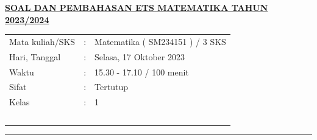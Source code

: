 \documentclass[10pt,openany,a4paper]{article}
\theoremstyle{definition}
\theoremstyle{definition}
\theoremstyle{plain}
\begin{document}
\newpage
 \begin{center}
	{\underline{\textbf{\MakeUppercase{Soal dan Pembahasan ETS Matematika Tahun 2023/2024}}}}
    \end{center}

    \begin{center}
	\begin{tabular}{lcl}
		Mata kuliah/SKS & : & Matematika ( SM234151 ) / 3 SKS\\
		Hari, Tanggal & : & Selasa, 17 Oktober 2023\\
		Waktu & : & 15.30 - 17.10 / 100 menit\\
		Sifat & : & Tertutup\\
		Kelas & : & 1\\
  ~
	\end{tabular}

    \noindent\rule{\textwidth}{2.pt}
        \end{center}
\end{document}
